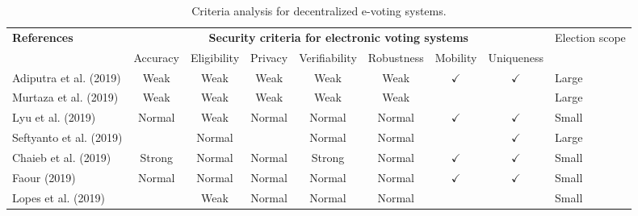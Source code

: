 \documentclass[../access.tex]{subfiles}
\begin{document}
        \begin{table}[htbp]
            \caption{Criteria analysis for decentralized e-voting systems.}
            \begin{adjustwidth}{-2cm}{}
                \begin{tabular}{m{4.4cm} c c c c c c c >{\centering\arraybackslash}m{0.7cm}} %
                    \toprule
                    \multirow{3.5}{=}{\textbf{\footnotesize{References}}} & \multicolumn{7}{c}{\textbf{\footnotesize{Security criteria for electronic voting systems}}} & \multirow{3.5}{=}{\footnotesize{Election scope}} \\
                    \cline{2-8}
                    \vspace{0.5cm}
                    \multirow{2}{=}{} & \footnotesize{Accuracy} & \footnotesize{Eligibility} & \footnotesize{Privacy} & \footnotesize{Verifiability} & \footnotesize{Robustness} & \footnotesize{Mobility} & \footnotesize{Uniqueness} & \multirow{2}{=}{} \\
                    \hline
                    \footnotesize{Adiputra et al. (2019) \cite{Adiputra2019}} & {Weak} & {Weak} & {Weak} & {Weak} & {Weak} & $ \checkmark $ & $ \checkmark $ & \footnotesize{Large} \\
                    \hline
                    \footnotesize{Murtaza et al. (2019) \cite{Murtaza2019}} & {Weak} & {Weak} & {Weak} & {Weak} & {Weak} & {} & {} & \footnotesize{Large} \\
                    \hline
                    \footnotesize{Lyu et al. (2019) \cite{Lyu2019}} & {Normal} & {Weak} & {Normal} & {Normal} & {Normal} & $ \checkmark $ & $ \checkmark $ & \footnotesize{Small} \\
                    \hline
                    \footnotesize{Seftyanto et al. (2019) \cite{Seftyanto2019}} & {} & {Normal} & {} & {Normal} & {Normal} & {} & $ \checkmark $ & \footnotesize{Large} \\
                    \hline
                    \footnotesize{Chaieb et al. (2019) \cite{Chaieb2019}} & {Strong} & {Normal} & {Normal} & {Strong} & {Normal} & $ \checkmark $ & $ \checkmark $ & \footnotesize{Small} \\
                    \hline
                    \footnotesize{Faour (2019) \cite{Faour2019}} & {Normal} & {Normal} & {Normal} & {Normal} & {Normal} & $ \checkmark $ & $ \checkmark $ & \footnotesize{Small} \\
                    \hline
                    \footnotesize{Lopes et al. (2019) \cite{Lopes2019}} & {} & {Weak} & {Normal} & {Normal} & {Normal} & {} & {} & \footnotesize{Small} \\

\end{tabular}
\end{adjustwidth}
\end{table}
\end{document}
